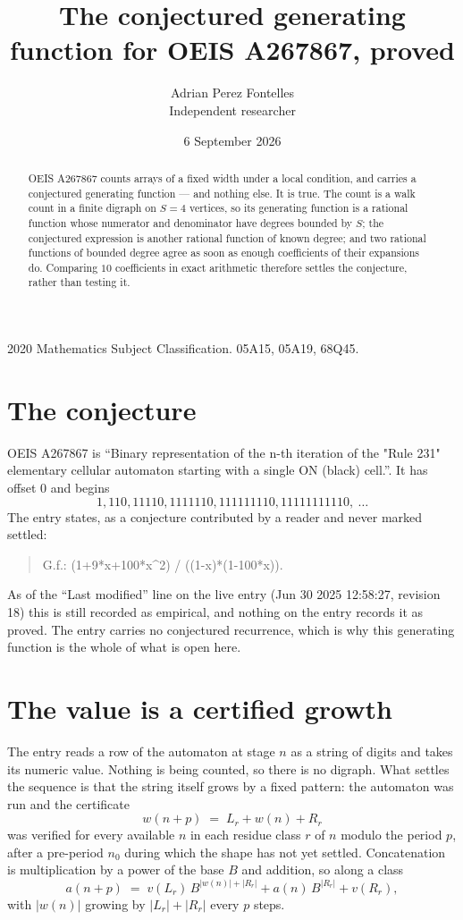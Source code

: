 \documentclass[11pt,a4paper]{article}
\title{The conjectured generating function for OEIS A267867, proved}
\author{Adrian Perez Fontelles\\ \small Independent researcher}
\date{6 September 2026}
\theoremstyle{plain}
\theoremstyle{definition}
\begin{document}
\maketitle

\begin{abstract}
OEIS A267867 counts arrays of a fixed width under a local condition, and carries a conjectured
generating function --- and nothing else. It is true. The count is a walk count in a finite
digraph on $S=4$ vertices, so its generating function is a rational function whose numerator
and denominator have degrees bounded by $S$; the conjectured expression is another rational
function of known degree; and two rational functions of bounded degree agree as soon as enough
coefficients of their expansions do. Comparing $10$ coefficients in exact arithmetic
therefore settles the conjecture, rather than testing it.
\end{abstract}

\noindent\small 2020 Mathematics Subject Classification. 05A15, 05A19, 68Q45.\normalsize

\section{The conjecture}

OEIS A267867 is ``Binary representation of the n-th iteration of the "Rule 231" elementary cellular automaton starting with a single ON (black) cell.''. It has offset $0$ and begins
\[
1, 110, 11110, 1111110, 111111110, 11111111110,\ \dots
\]
The entry states, as a conjecture contributed by a reader and never marked settled:
\begin{quote}
G.f.: (1+9*x+100*x\^{}2) / ((1-x)*(1-100*x)).
\end{quote}
As of the ``Last modified'' line on the live entry (Jun 30 2025 12:58:27, revision 18) this is still
recorded as empirical, and nothing on the entry records it as proved. The entry carries no
conjectured recurrence, which is why this generating function is the whole of what is open
here.


\section{The value is a certified growth}

The entry reads a row of the automaton at stage $n$ as a string of digits and takes its
numeric value. Nothing is being counted, so there is no digraph. What settles the sequence is
that the string itself grows by a fixed pattern: the automaton was run and the certificate
\[
w(n+p)\;=\;L_r + w(n) + R_r
\]
was verified for every available $n$ in each residue class $r$ of $n$ modulo the period $p$,
after a pre-period $n_0$ during which the shape has not yet settled. Concatenation is
multiplication by a power of the base $B$ and addition, so along a class
\[
a(n+p)\;=\;v(L_r)\,B^{|w(n)|+|R_r|} + a(n)\,B^{|R_r|} + v(R_r),
\]
with $|w(n)|$ growing by $|L_r|+|R_r|$ every $p$ steps.
\end{document}

